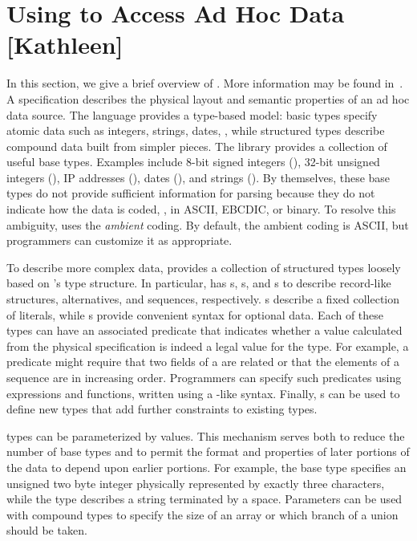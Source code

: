 \section{Using \pads{} to Access Ad Hoc Data [Kathleen]}
\label{section:pads}
In this section, we give a brief overview of \pads{}.  More
information may be found in~\cite{pldi05,padsmanual}.
A \pads{} specification describes the physical layout and 
semantic properties of an ad hoc data source. 
The language provides a type-based model:
basic types specify atomic data such as integers, strings, dates, \etc{}, while
structured types describe compound data built from simpler pieces.
The \pads{} library provides a collection of useful base types.
Examples include
8-bit signed integers (),
32-bit unsigned integers (),
IP addresses (), 
dates (), and strings ().
By themselves, these base types do not provide sufficient information for parsing
because they do not indicate how the data is coded, \ie{}, in ASCII, EBCDIC, or binary.  
To resolve this ambiguity, \pads{} uses the \textit{ambient} coding.
By default, the ambient coding is ASCII, but programmers can customize
it as appropriate.

To describe more complex data, \pads{} provides a collection of 
structured types loosely based on \C{}'s type structure.
In particular, \pads{} has 
s, s, and s to describe
record-like structures, alternatives, and sequences, respectively.
s describe a fixed collection of literals, while s 
provide convenient syntax for optional data.
Each of these
types can have an associated predicate that indicates whether a
value calculated from the physical specification is indeed a legal
value for the type.  For example, a predicate might require that two
fields of a  are related or that the elements
of a sequence are in increasing order.  Programmers can specify such
predicates using \pads{} expressions and functions, 
written using a \C{}-like syntax.
Finally, \pads{} s can be used
to define new types that add further constraints to existing types.

\pads{} types can be parameterized by values.
This mechanism serves both to reduce the number of base types and to permit the
format and properties of later portions of the data to depend upon earlier portions.
For example, 
the base type  specifies an unsigned two byte integer
physically represented by exactly three characters, while the type
describes a string terminated by a space.  Parameters can be 
used with compound types to specify the size of an array or which
branch of a union should be taken.


